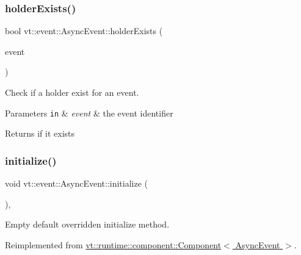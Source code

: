 \subsubsection{\texorpdfstring{holder\+Exists()}{holderExists()}}
{\footnotesize\ttfamily bool vt\+::event\+::\+Async\+Event\+::holder\+Exists (\begin{DoxyParamCaption}\item[{\hyperlink{namespacevt_a009267401def7ae8bf201892222d060f}{Event\+Type} const \&}]{event }\end{DoxyParamCaption})}



Check if a holder exist for an event. 


\begin{DoxyParams}[1]{Parameters}
\mbox{\tt in}  & {\em event} & the event identifier\\
\hline
\end{DoxyParams}
\begin{DoxyReturn}{Returns}
if it exists 
\end{DoxyReturn}
\mbox{\label{structvt_1_1event_1_1_async_event_ac8d9f977b1cca3f43a06d0e83bc88e3d}} 
\subsubsection{\texorpdfstring{initialize()}{initialize()}}
{\footnotesize\ttfamily void vt\+::event\+::\+Async\+Event\+::initialize (\begin{DoxyParamCaption}{ }\end{DoxyParamCaption})\hspace{0.3cm}{\ttfamily [override]}, {\ttfamily [virtual]}}



Empty default overridden initialize method. 



Reimplemented from \hyperlink{structvt_1_1runtime_1_1component_1_1_component_a7f07384d294e59796add9ce6be2d6410}{vt\+::runtime\+::component\+::\+Component$<$ Async\+Event $>$}.

\mbox{\label{structvt_1_1event_1_1_async_event_a10af2d5cb5318e2ef25eabcd88c8139a}} 
